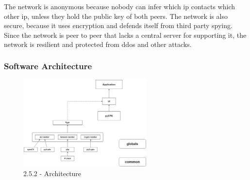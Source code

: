 \documentclass[a4paper,11pt]{article}
\begin{document}
The network is anonymous because nobody can infer which ip contacts which other ip, unless they hold the public key of both peers. The network is also secure, because it uses encryption and defends itself from third party spying. Since the network is peer to peer that lacks a central server for supporting it, the network is resilient and protected from ddos and other attacks.

\subsubsection{Software Architecture}

\begin{figure}[H]
\begin{center}
  \includegraphics[width=0.60\textwidth]{images/pype.jpg}
  \caption{2.5.2 - Architecture}
\end{center}
\end{figure}
\end{document}
